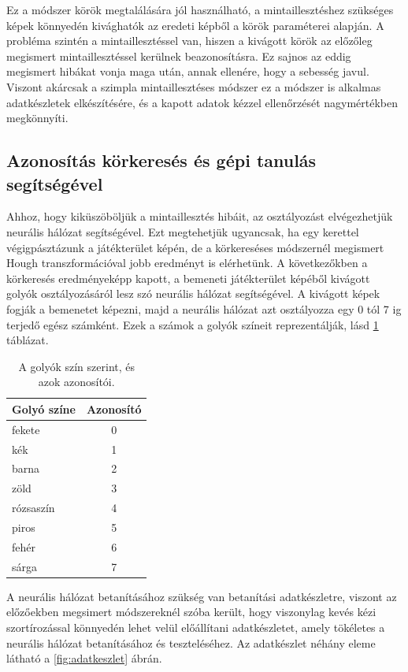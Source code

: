 \par Ez a módszer körök megtalálására jól használható, a mintaillesztéshez szükséges képek könnyedén kivághatók az eredeti képből a körök paraméterei alapján. A probléma szintén a mintaillesztéssel van, hiszen a kivágott körök az előzőleg megismert mintaillesztéssel kerülnek beazonosításra. Ez sajnos az eddig megismert hibákat vonja maga után, annak ellenére, hogy a sebesség javul. Viszont akárcsak a szimpla mintaillesztéses módszer ez a módszer is alkalmas adatkészletek elkészítésére, és a kapott adatok kézzel ellenőrzését nagymértékben megkönnyíti.

\subsection{Azonosítás körkeresés és gépi tanulás segítségével}
Ahhoz, hogy kiküszöböljük a mintaillesztés hibáit, az osztályozást elvégezhetjük neurális hálózat segítségével. Ezt megtehetjük ugyancsak, ha egy kerettel végigpásztázunk a játékterület képén, de a körkereséses módszernél megismert Hough transzformációval jobb eredményt is elérhetünk. A következőkben a körkeresés eredményeképp kapott, a bemeneti játékterület képéből kivágott golyók osztályozásáról lesz szó neurális hálózat segítségével. A kivágott képek fogják a bemenetet képezni, majd a neurális hálózat azt osztályozza egy 0 tól 7 ig terjedő egész számként. Ezek a számok a golyók színeit reprezentálják, lásd \ref{tab:golyo_azonositok} táblázat.

\begin{table}[!ht]
	\footnotesize
	\centering
	\begin{tabular}{ l c }
		\toprule
		Golyó színe & Azonosító \\
		\midrule
		fekete      & 0\\
        kék         & 1\\
        barna       & 2\\
        zöld        & 3\\
        rózsaszín   & 4\\
        piros       & 5\\
        fehér       & 6\\
        sárga       & 7\\
		\bottomrule
	\end{tabular}
	\caption{A golyók szín szerint, és azok azonosítói.}
	\label{tab:golyo_azonositok}
\end{table}

\par A neurális hálózat betanításához szükség van betanítási adatkészletre, viszont az előzőekben megsimert módszereknél szóba került, hogy viszonylag kevés kézi szortírozással könnyedén lehet velül előállítani adatkészletet, amely tökéletes a neurális hálózat betanításához és teszteléséhez. Az adatkészlet néhány eleme látható a \ref{fig:adatkeszlet} ábrán.

